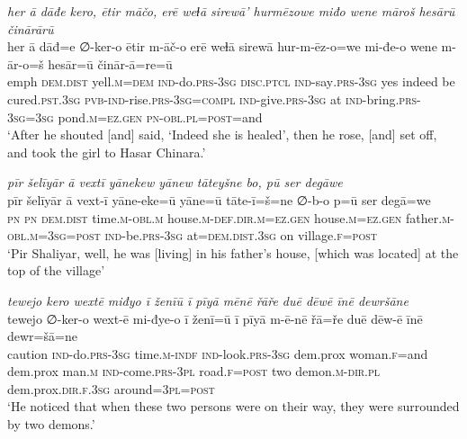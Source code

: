 \ea \label{ZP.61}
\textit{her ā dāđe kero, ētir māčo, erē weɫā sirewā’ hurmēzowe miđo wene māroš hesārū činārārū} \\ 
\gll her ā dāđ=e ∅-ker-o ētir m-āč-o erē weɫā sirewā hur-m-ēz-o=we mi-đe-o wene m-ār-o=š hesār=ū činār-ā=re=ū \\ 
 emph \textsc{dem.dist} yell\textsc{.m}\textsc{=dem} \textsc{ind-}do\textsc{.prs}\textsc{-3sg} \textsc{disc.ptcl} \textsc{ind-}say\textsc{.prs}\textsc{-3sg} yes indeed be cured\textsc{.pst}\textsc{.3sg} \textsc{pvb-}\textsc{ind-}rise\textsc{.prs}\textsc{-3sg}\textsc{=compl} \textsc{ind-}give\textsc{.prs}\textsc{-3sg} at \textsc{ind-}bring\textsc{.prs}\textsc{-3sg}\textsc{=3sg} pond\textsc{.m}\textsc{\textsc{=ez.gen}} \textsc{pn}\textsc{-obl}\textsc{.pl}\textsc{=\textsc{post}}=and \\ 
\glt `After he shouted [and] said, ‘Indeed she is healed’, then he rose, [and] set off, and took the girl to Hasar Chinara.'
\z 
 
\ea \label{ZP.65}
\textit{pīr šelīyār ā vextī yānekew yānew tāteyšne bo, pū ser degāwe} \\ 
\gll pīr šelīyār ā vext-ī yāne-eke=ū yāne=ū tāte-ī=š=ne ∅-b-o p=ū ser degā=we \\ 
 \textsc{pn} \textsc{pn} \textsc{dem.dist} time\textsc{.m}\textsc{-obl}\textsc{.m} house\textsc{.m}\textsc{-def}\textsc{.dir}\textsc{.m}\textsc{\textsc{=ez.gen}} house\textsc{.m}\textsc{\textsc{=ez.gen}} father\textsc{.m}\textsc{-obl}\textsc{.m}\textsc{=3sg}\textsc{=\textsc{post}} \textsc{ind-}be\textsc{.prs}\textsc{-3sg} at=\textsc{dem.dist}\textsc{.3sg} on village\textsc{.f}\textsc{=\textsc{post}} \\ 
\glt `Pir Shaliyar, well, he was [living] in his father’s house, [which was located] at the top of the village'
\z 
 
\ea \label{ZP.67}
\textit{tewejo kero wextē miđyo ī ženīū ī pīyā mēnē řāře duē dēwē īnē dewršāne} \\ 
\gll tewejo ∅-ker-o wext-ē mi-đye-o ī ženī=ū ī pīyā m-ē-nē řā=ře duē dēw-ē īnē dewr=šā=ne \\ 
 caution \textsc{ind-}do\textsc{.prs}\textsc{-3sg} time\textsc{.m}\textsc{-indf} \textsc{ind-}look\textsc{.prs}\textsc{-3sg} dem.prox woman\textsc{.f}=and dem.prox man\textsc{.m} \textsc{ind-}come\textsc{.prs}\textsc{-3pl} road\textsc{.f}\textsc{=\textsc{post}} two demon\textsc{.m}\textsc{-dir}\textsc{.pl} dem.prox\textsc{.dir}\textsc{.f}\textsc{.3sg} around\textsc{=3pl}\textsc{=\textsc{post}} \\ 
\glt `He noticed that when these two persons were on their way, they were surrounded by two demons.'
\z 
 
